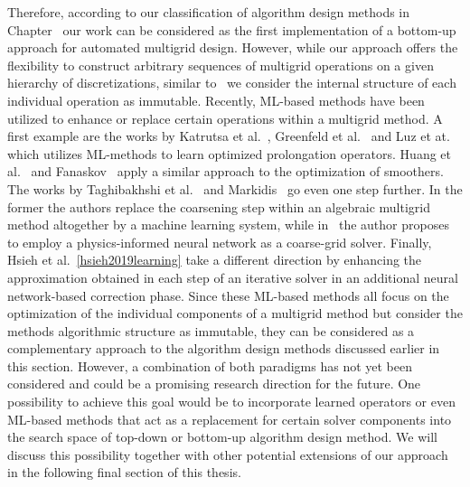 Therefore, according to our classification of algorithm design methods in Chapter~%
our work can be considered as the first implementation of a bottom-up approach for automated multigrid design.
However, while our approach offers the flexibility to construct arbitrary sequences of multigrid operations on a given hierarchy of discretizations, similar to~\cite{oosterlee2003genetic,thekale2010optimizing,brown2021tuning} we consider the internal structure of each individual operation as immutable.
Recently, ML-based methods have been utilized to enhance or replace certain operations within a multigrid method.
A first example are the works by Katrutsa et al.~\cite{katrutsa2020black}, Greenfeld et al.~\cite{greenfeld2019learning} and Luz et at.~\cite{luz2020learning} which utilizes ML-methods to learn optimized prolongation operators.
Huang et al.~\cite{huang2021learning} and Fanaskov~\cite{fanaskov2021neural} apply a similar approach to the optimization of smoothers.
The works by Taghibakhshi et al.~\cite{taghibakhshi2021optimization} and Markidis~\cite{markidis2021old} go even one step further.
In the former the authors replace the coarsening step within an algebraic multigrid method altogether by a machine learning system, while in~\cite{markidis2021old} the author proposes to employ a physics-informed neural network as a coarse-grid solver.
Finally, Hsieh et al.~\ref{hsieh2019learning} take a different direction by enhancing the approximation obtained in each step of an iterative solver in an additional neural network-based correction phase.
Since these ML-based methods all focus on the optimization of the individual components of a multigrid method but consider the methods algorithmic structure as immutable, they can be considered as a complementary approach to the algorithm design methods discussed earlier in this section.
However, a combination of both paradigms has not yet been considered and could be a promising research direction for the future.
One possibility to achieve this goal would be to incorporate learned operators or even ML-based methods that act as a replacement for certain solver components into the search space of top-down or bottom-up algorithm design method.
We will discuss this possibility together with other potential extensions of our approach in the following final section of this thesis.
